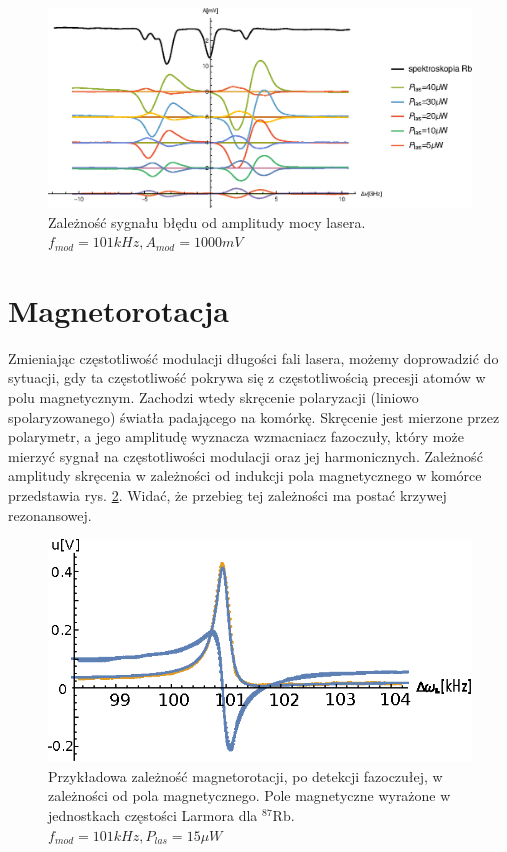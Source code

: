 \documentclass[a4paper,10pt,twoside]{article}
\begin{document}
\begin{figure}[h!]
\centering
 \includegraphics[width=\textwidth]{panoramy_1H_odp.eps}
 \caption{Zależność sygnału błędu od amplitudy mocy lasera. $f_{mod}=101kHz, A_{mod}=1000mV$}
 \label{fig:panodp}
\end{figure}

\section{Magnetorotacja}
\label{sec:magnetorotacja}


Zmieniając częstotliwość modulacji długości fali lasera, możemy doprowadzić do sytuacji, gdy ta częstotliwość pokrywa się z częstotliwością precesji atomów w polu magnetycznym.
Zachodzi wtedy skręcenie polaryzacji (liniowo spolaryzowanego) światła padającego na komórkę. Skręcenie jest mierzone przez polarymetr, a jego amplitudę wyznacza wzmacniacz fazoczuły, który może mierzyć sygnał na częstotliwości modulacji oraz jej harmonicznych. Zależność amplitudy skręcenia w zależności od indukcji pola magnetycznego w komórce przedstawia rys. \ref{fig:magnetorot1}. Widać, że przebieg tej zależności ma postać krzywej rezonansowej.

\begin{figure}[h!]
\centering
 \includegraphics[width=\textwidth]{magnetorot1.eps}
 \caption{Przykładowa zależność magnetorotacji, po detekcji fazoczułej, w zależności od pola magnetycznego. Pole magnetyczne wyrażone w jednostkach częstości Larmora dla ${}^{87} \mathrm{Rb}$.
 $f_{mod}=101kHz, P_{las}=15 \mu W$}
 \label{fig:magnetorot1}
\end{figure}
\end{document}
